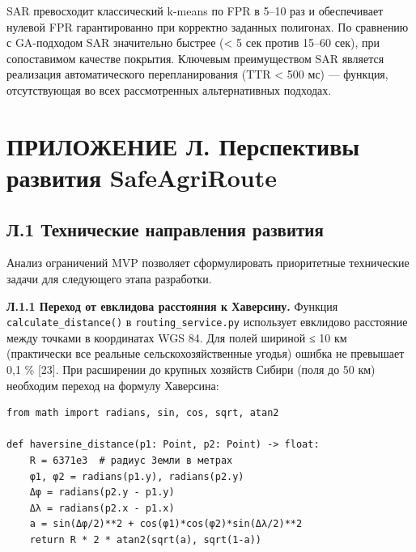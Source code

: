\documentclass[14pt,a4paper]{extarticle}
\begin{document}
SAR превосходит классический k-means по FPR в 5--10 раз и обеспечивает нулевой FPR гарантированно при корректно заданных полигонах. По сравнению с GA-подходом SAR значительно быстрее (\textless{} 5 сек против 15--60 сек), при сопоставимом качестве покрытия. Ключевым преимуществом SAR является реализация автоматического перепланирования (TTR \textless{} 500 мс) --- функция, отсутствующая во всех рассмотренных альтернативных подходах.


\hypertarget{ux43fux440ux438ux43bux43eux436ux435ux43dux438ux435-ux43b.-ux43fux435ux440ux441ux43fux435ux43aux442ux438ux432ux44b-ux440ux430ux437ux432ux438ux442ux438ux44f-safeagriroute}{%
\section{ПРИЛОЖЕНИЕ Л. Перспективы развития SafeAgriRoute}\label{ux43fux440ux438ux43bux43eux436ux435ux43dux438ux435-ux43b.-ux43fux435ux440ux441ux43fux435ux43aux442ux438ux432ux44b-ux440ux430ux437ux432ux438ux442ux438ux44f-safeagriroute}}

\hypertarget{ux43b.1-ux442ux435ux445ux43dux438ux447ux435ux441ux43aux438ux435-ux43dux430ux43fux440ux430ux432ux43bux435ux43dux438ux44f-ux440ux430ux437ux432ux438ux442ux438ux44f}{%
\subsection{Л.1 Технические направления развития}\label{ux43b.1-ux442ux435ux445ux43dux438ux447ux435ux441ux43aux438ux435-ux43dux430ux43fux440ux430ux432ux43bux435ux43dux438ux44f-ux440ux430ux437ux432ux438ux442ux438ux44f}}

Анализ ограничений MVP позволяет сформулировать приоритетные технические задачи для следующего этапа разработки.

\textbf{Л.1.1 Переход от евклидова расстояния к Хаверсину.} Функция \texttt{calculate\_distance()} в \texttt{routing\_service.py} использует евклидово расстояние между точками в координатах WGS 84. Для полей шириной ≤ 10 км (практически все реальные сельскохозяйственные угодья) ошибка не превышает 0,1 \% {[}23{]}. При расширении до крупных хозяйств Сибири (поля до 50 км) необходим переход на формулу Хаверсина:

\begin{verbatim}
from math import radians, sin, cos, sqrt, atan2

def haversine_distance(p1: Point, p2: Point) -> float:
    R = 6371e3  # радиус Земли в метрах
    φ1, φ2 = radians(p1.y), radians(p2.y)
    Δφ = radians(p2.y - p1.y)
    Δλ = radians(p2.x - p1.x)
    a = sin(Δφ/2)**2 + cos(φ1)*cos(φ2)*sin(Δλ/2)**2
    return R * 2 * atan2(sqrt(a), sqrt(1-a))
\end{verbatim}
\end{document}
